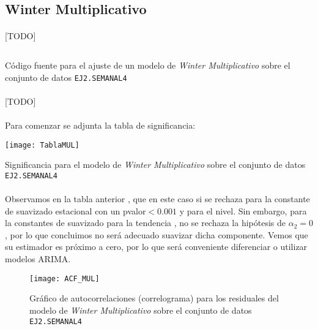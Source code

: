 \documentclass[a4paper, spanish]{article}
\begin{document}
    \subsection{Winter Multiplicativo}

      \paragraph{}
      [TODO]

      \begin{listing}[htb!]
        \centering
        \inputminted{SAS}{./res/code/b-01-esm-wintermul.sas}
        \caption{Código fuente para el ajuste de un modelo de \emph{Winter Multiplicativo} sobre el conjunto de datos \texttt{EJ2.SEMANAL4}}
        \label{code:b_winter_multiplicative_esm}
      \end{listing}

      \paragraph{}
      [TODO]

      \paragraph{}
      Para comenzar se adjunta la tabla de significancia:

      \begin{table}[htb!]
        \centering
        \texttt{[image: TablaMUL]}
        \caption{Significancia para el modelo de \emph{Winter Multiplicativo} sobre el conjunto de datos \texttt{EJ2.SEMANAL4}}
        \label{table:b_winter_multiplicative_significance}
      \end{table}

      \paragraph{}
      Observamos en la tabla anterior , que en este caso si se rechaza para la constante de suavizado estacional con un pvalor$ <0.001$ y para el nivel. Sin embargo, para la constantes de suavizado para la tendencia , no se rechaza la hipótesis de $\alpha_2 =0$, por lo que concluimos no será adecuado suavizar dicha componente. Vemos que su estimador es próximo a cero, por lo que será conveniente diferenciar o utilizar modelos ARIMA.

      \begin{figure}[htb!]
        \centering
        \texttt{[image: ACF\_MUL]}
        \caption{Gráfico de autocorrelaciones (correlograma) para los residuales del modelo de \emph{Winter Multiplicativo} sobre el conjunto de datos \texttt{EJ2.SEMANAL4}}
        \label{img:b_winter_multiplicative_residuals_correlogram}
      \end{figure}
\end{document}
